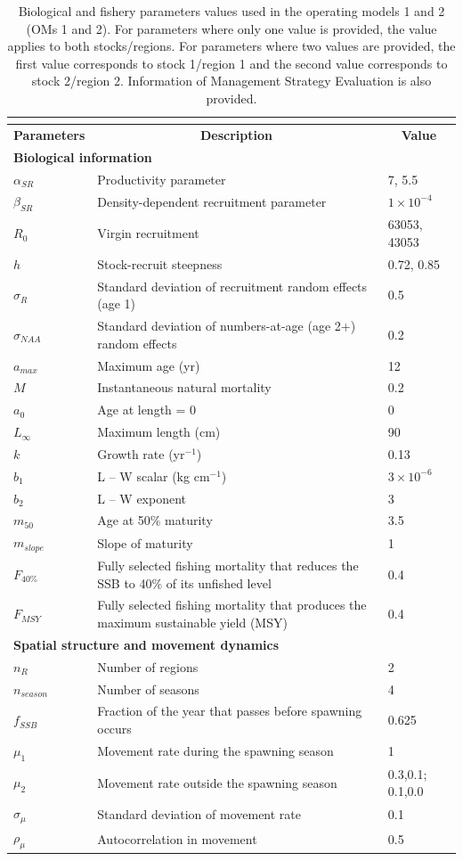 \begin{center}
\begin{longtable}{p{2cm} p{10cm} p{2cm}}
\caption{Biological and fishery parameters values used in the operating models 1 and 2 (OMs 1 and 2). For parameters where only one value is provided, the value applies to both stocks/regions. For parameters where two values are provided, the first value corresponds to stock 1/region 1 and the second value corresponds to stock 2/region 2. Information of Management Strategy Evaluation is also provided.} \\
\label{para_tab} \\
\hline
\multicolumn{1}{c}{\textbf{Parameters}} & \multicolumn{1}{c}{\textbf{Description}} & \multicolumn{1}{c}{\textbf{Value}} \tabularnewline
\hline

\multicolumn{3}{l}{\textbf{Biological information}} \tabularnewline
$\alpha_{SR}$ & Productivity parameter & 7, 5.5 \tabularnewline
$\beta_{SR}$ & Density-dependent recruitment parameter & $1 \times 10^{-4}$ \tabularnewline
$R_0$ & Virgin recruitment & 63053, 43053 \tabularnewline
$h$ & Stock-recruit steepness & 0.72, 0.85 \tabularnewline
$\sigma_R$ & Standard deviation of recruitment random effects (age 1) & 0.5 \tabularnewline
$\sigma_{NAA}$ & Standard deviation of numbers-at-age (age 2+) random effects & 0.2 \tabularnewline
$a_{max}$ & Maximum age (yr) & 12 \tabularnewline
$M$ & Instantaneous natural mortality & 0.2 \tabularnewline
$a_0$ & Age at length = 0 & 0 \tabularnewline
$L_\infty$ & Maximum length (cm) & 90 \tabularnewline
$k$ & Growth rate (yr$^{-1}$) & 0.13 \tabularnewline
$b_1$ & L – W scalar (kg cm$^{-1}$) & $3 \times 10^{-6}$ \tabularnewline
$b_2$ & L – W exponent & 3 \tabularnewline
$m_{50}$ & Age at 50\% maturity & 3.5 \tabularnewline
$m_{slope}$ & Slope of maturity & 1 \tabularnewline
$F_{40\%}$ & Fully selected fishing mortality that reduces the SSB to 40\% of its unfished level & 0.4 \tabularnewline
$F_{MSY}$ & Fully selected fishing mortality that produces the maximum sustainable yield (MSY) & 0.4 \tabularnewline

\multicolumn{3}{l}{\textbf{Spatial structure and movement dynamics}} \tabularnewline
$n_{R}$ & Number of regions & 2 \tabularnewline
$n_{season}$ & Number of seasons & 4 \tabularnewline
$f_{SSB}$ & Fraction of the year that passes before spawning occurs & 0.625 \tabularnewline
$\mu_1$ & Movement rate during the spawning season & 1 \tabularnewline
$\mu_2$ & Movement rate outside the spawning season & 0.3,0.1; 0.1,0.0\tabularnewline
$\sigma_\mu$ & Standard deviation of movement rate & 0.1 \tabularnewline
$\rho_\mu$ & Autocorrelation in movement & 0.5 \tabularnewline


\end{longtable}
\end{center}
